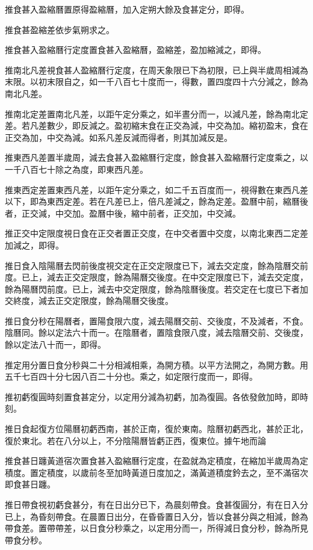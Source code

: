 推食甚入盈縮曆置原得盈縮曆，加入定朔大餘及食甚定分，即得。

推食甚盈縮差依步氣朔求之。

推食甚入盈縮曆行定度置食甚入盈縮曆，盈縮差，盈加縮減之，即得。

推南北凡差視食甚人盈縮曆行定度，在周天象限已下為初限，已上與半歲周相減為末限。以初末限自之，如一千八百七十度而一，得數，置四度四十六分減之，餘為南北凡差。

推南北定差置南北凡差，以距午定分乘之，如半晝分而一，以減凡差，餘為南北定差。若凡差數少，即反減之。盈初縮末食在正交為減，中交為加。縮初盈末，食在正交為加，中交為減。如系凡差反減而得者，則其加減反是。

推東西凡差置半歲周，減去食甚入盈縮曆行定度，餘食甚入盈縮曆行定度乘之，以一千八百七十除之為度，即東西凡差。

推東西定差置東西凡差，以距午定分乘之，如二千五百度而一，視得數在東西凡差以下，即為東西定差。若在凡差已上，倍凡差減之，餘為定差。盈曆中前，縮曆後者，正交減，中交加。盈曆中後，縮中前者，正交加，中交減。

推正交中定限度視日食在正交者置正交度，在中交者置中交度，以南北東西二定差加減之，即得。

推日食入陰陽曆去閃前後度視交定在正交定限度已下，減去交定度，餘為陰曆交前度。已上，減去正交定限度，餘為陽曆交後度。在中交定限度已下，減去交定度，餘為陽曆閃前度。已上，減去中交定限度，餘為陰曆後度。若交定在七度已下者加交終度，減去正交定限度，餘為陽曆交後度。

推日食分秒在陽曆者，置陽食限六度，減去陽曆交前、交後度，不及減者，不食。陰曆同。餘以定法六十而一。在陰曆者，置陰食限八度，減去陰曆交前、交後度，餘以定法八十而一，即得。

推定用分置日食分秒與二十分相減相乘，為開方積。以平方法開之，為開方數。用五千七百四十分七因八百二十分也。乘之，如定限行度而一，即得。

推初虧復圓時刻置食甚定分，以定用分減為初虧，加為復圓。各依發斂加時，即時刻。

推日食起復方位陽曆初虧西南，甚於正南，復於東南。陰曆初虧西北，甚於正北，復於東北。若在八分以上，不分陰陽曆皆虧正西，復東位。據午地而論

推食甚日躔黃道宿次置食甚入盈縮曆行定度，在盈就為定積度，在縮加半歲周為定積度。置定積度，以歲前冬至加時黃道日度加之，滿黃道積度鈐去之，至不滿宿次即食甚日躔。

推日帶食視初虧食甚分，有在日出分已下，為晨刻帶食。食甚復圓分，有在日入分已上，為昏刻帶食。在晨置日出分，在昏昏置日入分，皆以食甚分與之相減，餘為帶食差。置帶帶差，以日食分秒乘之，以定用分而一，所得減日食分秒，餘為所見帶食分秒。

